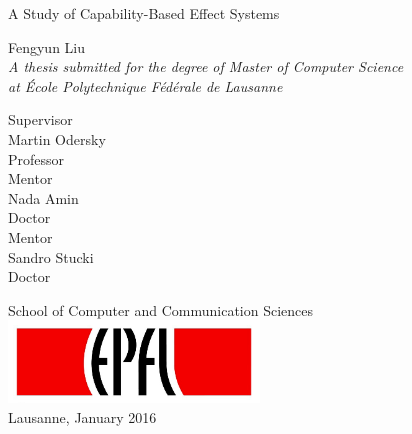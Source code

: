 \begin{titlepage}

  \begin{center}

    \vspace*{2\baselineskip}
    {\LARGE A Study of Capability-Based Effect Systems\\[2cm] }

    \noindent
    Fengyun Liu \\[2cm]

    \noindent
    \emph{A thesis submitted for the degree of Master of Computer
      Science \\
    at École Polytechnique Fédérale de Lausanne} \\[1.8cm]

    \noindent
    \begin{multicols}{3}
    Supervisor \\
    Martin Odersky \\
    Professor \\
    \vfill
    \columnbreak
    Mentor \\
    Nada Amin \\
    Doctor \\
    \vfill
    \columnbreak
    Mentor \\
    Sandro Stucki\\
    Doctor \\
    \end{multicols}

    \vspace*{2\baselineskip}

    \noindent
    {School of Computer and Communication Sciences \\[1cm]}
    \includegraphics[width=0.5\textwidth]{img/epfl}~\\[1cm]
    \noindent
    Lausanne, January 2016 \\[1cm]



  \end{center}

\end{titlepage}
